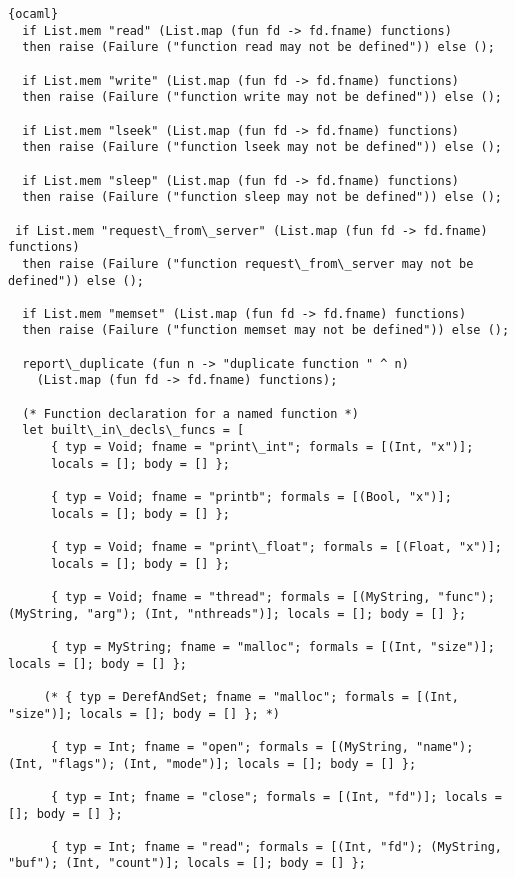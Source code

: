 \begin{lstlisting}{ocaml}
  if List.mem "read" (List.map (fun fd -> fd.fname) functions)
  then raise (Failure ("function read may not be defined")) else ();

  if List.mem "write" (List.map (fun fd -> fd.fname) functions)
  then raise (Failure ("function write may not be defined")) else ();

  if List.mem "lseek" (List.map (fun fd -> fd.fname) functions)
  then raise (Failure ("function lseek may not be defined")) else ();

  if List.mem "sleep" (List.map (fun fd -> fd.fname) functions)
  then raise (Failure ("function sleep may not be defined")) else ();
 
 if List.mem "request\_from\_server" (List.map (fun fd -> fd.fname) functions)
  then raise (Failure ("function request\_from\_server may not be defined")) else ();

  if List.mem "memset" (List.map (fun fd -> fd.fname) functions)
  then raise (Failure ("function memset may not be defined")) else ();

  report\_duplicate (fun n -> "duplicate function " ^ n)
    (List.map (fun fd -> fd.fname) functions);

  (* Function declaration for a named function *)
  let built\_in\_decls\_funcs = [
      { typ = Void; fname = "print\_int"; formals = [(Int, "x")];
      locals = []; body = [] };

      { typ = Void; fname = "printb"; formals = [(Bool, "x")];
      locals = []; body = [] }; 

      { typ = Void; fname = "print\_float"; formals = [(Float, "x")];
      locals = []; body = [] }; 

      { typ = Void; fname = "thread"; formals = [(MyString, "func"); (MyString, "arg"); (Int, "nthreads")]; locals = []; body = [] };

      { typ = MyString; fname = "malloc"; formals = [(Int, "size")]; locals = []; body = [] };

     (* { typ = DerefAndSet; fname = "malloc"; formals = [(Int, "size")]; locals = []; body = [] }; *)

      { typ = Int; fname = "open"; formals = [(MyString, "name"); (Int, "flags"); (Int, "mode")]; locals = []; body = [] };

      { typ = Int; fname = "close"; formals = [(Int, "fd")]; locals = []; body = [] };

      { typ = Int; fname = "read"; formals = [(Int, "fd"); (MyString, "buf"); (Int, "count")]; locals = []; body = [] };


\end{lstlisting}
